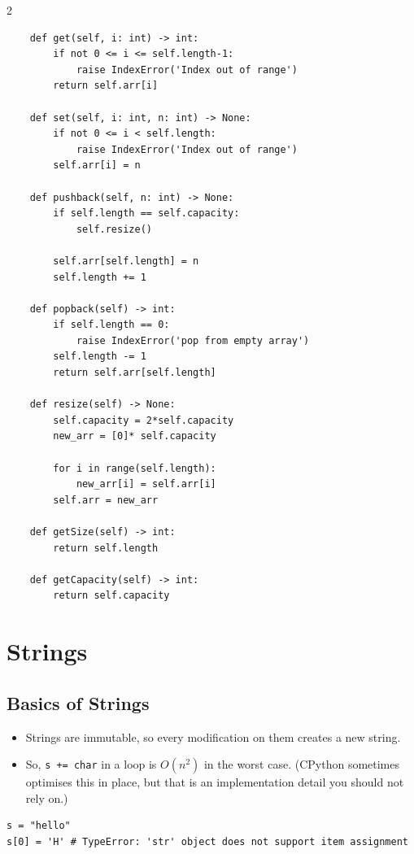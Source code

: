 \documentclass[9pt,a4paper]{extarticle}
\begin{document}
\begin{multicols}{2}
\begin{lstlisting}
    def get(self, i: int) -> int:
        if not 0 <= i <= self.length-1:
            raise IndexError('Index out of range')
        return self.arr[i]

    def set(self, i: int, n: int) -> None:
        if not 0 <= i < self.length:
            raise IndexError('Index out of range')
        self.arr[i] = n

    def pushback(self, n: int) -> None:
        if self.length == self.capacity:
            self.resize()

        self.arr[self.length] = n
        self.length += 1

    def popback(self) -> int:
        if self.length == 0:
            raise IndexError('pop from empty array')
        self.length -= 1
        return self.arr[self.length]

    def resize(self) -> None:
        self.capacity = 2*self.capacity
        new_arr = [0]* self.capacity

        for i in range(self.length):
            new_arr[i] = self.arr[i]
        self.arr = new_arr

    def getSize(self) -> int:
        return self.length

    def getCapacity(self) -> int:
        return self.capacity
\end{lstlisting}

\section{Strings}

\subsection{Basics of Strings}

\begin{itemize}
\item Strings are immutable, so every modification on them creates a new string.
\item So, \texttt{s +\allowbreak{}=\allowbreak{} char} in a loop is $O(n^2)$ in the worst case. (CPython sometimes optimises this in place, but that is an implementation detail you should not rely on.)
\end{itemize}

\begin{lstlisting}
s = "hello"
s[0] = 'H' # TypeError: 'str' object does not support item assignment
\end{lstlisting}


\end{multicols}
\end{document}
